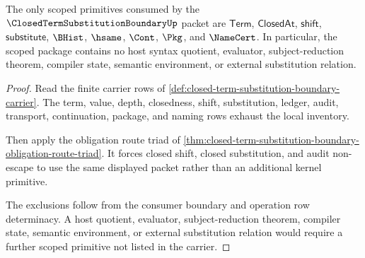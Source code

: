 \begin{theorem}
\label{thm:closed-term-substitution-boundary-kernel-scope-package}
The only scoped primitives consumed by the $\ClosedTermSubstitutionBoundaryUp$ packet are $\mathsf{Term}$, $\mathsf{ClosedAt}$, $\mathsf{shift}$, $\mathsf{substitute}$, $\BHist$, $\hsame$, $\Cont$, $\Pkg$, and $\NameCert$. In particular, the scoped package contains no host syntax quotient, evaluator, subject-reduction theorem, compiler state, semantic environment, or external substitution relation.
\end{theorem}
\begin{proof}
Read the finite carrier rows of \autoref{def:closed-term-substitution-boundary-carrier}. The term, value, depth, closedness, shift, substitution, ledger, audit, transport, continuation, package, and naming rows exhaust the local inventory.

Then apply the obligation route triad of \autoref{thm:closed-term-substitution-boundary-obligation-route-triad}. It forces closed shift, closed substitution, and audit non-escape to use the same displayed packet rather than an additional kernel primitive.

The exclusions follow from the consumer boundary and operation row determinacy. A host quotient, evaluator, subject-reduction theorem, compiler state, semantic environment, or external substitution relation would require a further scoped primitive not listed in the carrier.
\end{proof}


